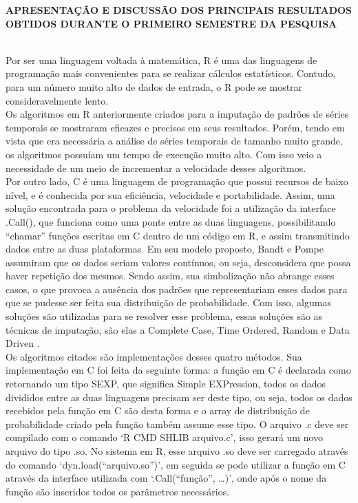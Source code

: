\documentclass{article}
\begin{document}
\newpage
\begin{center}
\textbf{\large{APRESENTAÇÃO E DISCUSSÃO DOS PRINCIPAIS RESULTADOS OBTIDOS DURANTE O PRIMEIRO SEMESTRE DA PESQUISA}}\\
\hrulefill \\
\end{center}
    
Por ser uma linguagem voltada à matemática, R é uma das linguagens de programação mais convenientes para se realizar cálculos estatísticos. Contudo, para um número muito alto de dados de entrada, o R pode se mostrar consideravelmente lento.\\
Os algoritmos em R anteriormente criados para a imputação de padrões de séries temporais se mostraram eficazes e precisos em seus resultados. Porém, tendo em vista que era necessária a análise de séries temporais de tamanho muito grande, os algoritmos possuíam um tempo de execução muito alto. Com isso veio a necessidade de um meio de incrementar a velocidade desses algoritmos.\\
Por outro lado, C é uma linguagem de programação que possui recursos de baixo nível, e é conhecida por sua eficiência, velocidade e portabilidade. Assim, uma solução encontrada para o problema da velocidade foi a utilização da interface .Call(), que funciona como uma ponte entre as duas linguagens, possibilitando “chamar” funções escritas em C dentro de um código em R, e assim transmitindo dados entre as duas plataformas.
Em seu modelo proposto, Bandt e Pompe assumiram que os dados seriam valores contínuos, ou seja, desconsidera que possa haver repetição dos mesmos. Sendo assim, sua simbolização não abrange esses casos, o que provoca a ausência dos padrões que representariam esses dados para que se pudesse ser feita sua distribuição de probabilidade. Com isso, algumas soluções são utilizadas para se resolver esse problema, essas soluções são as técnicas de imputação, são elas a Complete Case, Time Ordered, Random e Data Driven \cite{traversaro2018bandt}.\\
Os algoritmos citados são implementações desses quatro métodos. Sua implementação em C foi feita da seguinte forma: a função em C é declarada como retornando um tipo SEXP, que significa Simple EXPression, todos os dados divididos entre as duas linguagens precisam ser deste tipo, ou seja, todos os dados recebidos pela função em C são desta forma e o array de distribuição de probabilidade criado pela função também assume esse tipo. O arquivo .c deve ser compilado com o comando ‘R CMD SHLIB arquivo.c’, isso gerará um novo arquivo do tipo .so. No sistema em R, esse arquivo .so deve ser carregado através do comando ‘dyn.load(“arquivo.so”)’, em seguida se pode utilizar a função em C através da interface utilizada com ‘.Call(“função”, …)’, onde após o nome da função são inseridos todos os parâmetros necessários\cite{.Call}\cite{Extensions}.\\
\end{document}
